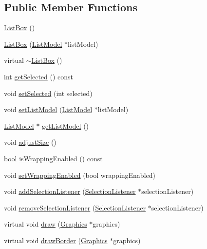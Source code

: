\subsection*{Public Member Functions}
\begin{DoxyCompactItemize}
\item 
\hyperlink{classgcn_1_1ListBox_a3842dd7dc63b42102867b2738f2577bb}{List\+Box} ()
\item 
\hyperlink{classgcn_1_1ListBox_a9f89f39bf6a5dc13521e3bbe15f59c79}{List\+Box} (\hyperlink{classgcn_1_1ListModel}{List\+Model} $\ast$list\+Model)
\item 
virtual \hyperlink{classgcn_1_1ListBox_a5d843351744f524cadea7cb02d1e1ab2}{$\sim$\+List\+Box} ()
\item 
int \hyperlink{classgcn_1_1ListBox_ae261b61fbf1e56771860dcebf69cdfa0}{get\+Selected} () const 
\item 
void \hyperlink{classgcn_1_1ListBox_a2c7d1e7db0473c23ce266e78226e05e1}{set\+Selected} (int selected)
\item 
void \hyperlink{classgcn_1_1ListBox_adb2a602ab69785cc950e78346c7e135e}{set\+List\+Model} (\hyperlink{classgcn_1_1ListModel}{List\+Model} $\ast$list\+Model)
\item 
\hyperlink{classgcn_1_1ListModel}{List\+Model} $\ast$ \hyperlink{classgcn_1_1ListBox_a778c05a84e69877361c2606f0b176269}{get\+List\+Model} ()
\item 
void \hyperlink{classgcn_1_1ListBox_afcf01ccbf2bee8db5fb5a61698c3836c}{adjust\+Size} ()
\item 
bool \hyperlink{classgcn_1_1ListBox_ad4421c5c9316b7b1af1b98f2aba78ec5}{is\+Wrapping\+Enabled} () const 
\item 
void \hyperlink{classgcn_1_1ListBox_a75a9bb147504aaa7232015fcdf3b9066}{set\+Wrapping\+Enabled} (bool wrapping\+Enabled)
\item 
void \hyperlink{classgcn_1_1ListBox_afba1e00e02d89540fc2ac77886019b70}{add\+Selection\+Listener} (\hyperlink{classgcn_1_1SelectionListener}{Selection\+Listener} $\ast$selection\+Listener)
\item 
void \hyperlink{classgcn_1_1ListBox_a6e7972a63f9e088b00db9a1a6c352891}{remove\+Selection\+Listener} (\hyperlink{classgcn_1_1SelectionListener}{Selection\+Listener} $\ast$selection\+Listener)
\item 
virtual void \hyperlink{classgcn_1_1ListBox_a6c12d3659318a214896f56ab704a78b6}{draw} (\hyperlink{classgcn_1_1Graphics}{Graphics} $\ast$graphics)
\item 
virtual void \hyperlink{classgcn_1_1ListBox_ad92a3828f087c6f4bd385c88d654e111}{draw\+Border} (\hyperlink{classgcn_1_1Graphics}{Graphics} $\ast$graphics)

\end{DoxyCompactItemize}
